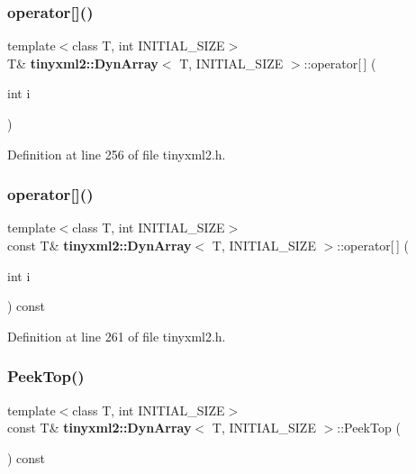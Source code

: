 \subsubsection{operator[]()\hspace{0.1cm}{\footnotesize\ttfamily [1/2]}}
{\footnotesize\ttfamily template$<$class T, int I\+N\+I\+T\+I\+A\+L\+\_\+\+S\+I\+ZE$>$ \\
T\& \textbf{ tinyxml2\+::\+Dyn\+Array}$<$ T, I\+N\+I\+T\+I\+A\+L\+\_\+\+S\+I\+ZE $>$\+::operator[$\,$] (\begin{DoxyParamCaption}\item[{int}]{i }\end{DoxyParamCaption})\hspace{0.3cm}{\ttfamily [inline]}}



Definition at line 256 of file tinyxml2.\+h.

\mbox{\label{classtinyxml2_1_1_dyn_array_a474a5cd9bc97ea32b3dcef4c773125e1}} 
\subsubsection{operator[]()\hspace{0.1cm}{\footnotesize\ttfamily [2/2]}}
{\footnotesize\ttfamily template$<$class T, int I\+N\+I\+T\+I\+A\+L\+\_\+\+S\+I\+ZE$>$ \\
const T\& \textbf{ tinyxml2\+::\+Dyn\+Array}$<$ T, I\+N\+I\+T\+I\+A\+L\+\_\+\+S\+I\+ZE $>$\+::operator[$\,$] (\begin{DoxyParamCaption}\item[{int}]{i }\end{DoxyParamCaption}) const\hspace{0.3cm}{\ttfamily [inline]}}



Definition at line 261 of file tinyxml2.\+h.

\mbox{\label{classtinyxml2_1_1_dyn_array_a5e4e1e408e646688503dec77c77c9d59}} 
\subsubsection{PeekTop()}
{\footnotesize\ttfamily template$<$class T, int I\+N\+I\+T\+I\+A\+L\+\_\+\+S\+I\+ZE$>$ \\
const T\& \textbf{ tinyxml2\+::\+Dyn\+Array}$<$ T, I\+N\+I\+T\+I\+A\+L\+\_\+\+S\+I\+ZE $>$\+::Peek\+Top (\begin{DoxyParamCaption}{ }\end{DoxyParamCaption}) const\hspace{0.3cm}{\ttfamily [inline]}}



